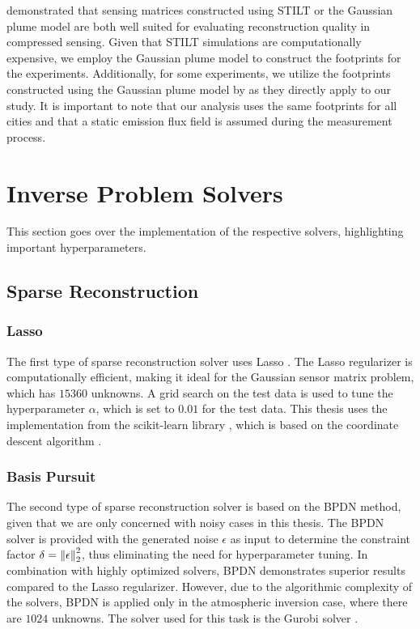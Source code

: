 \textcite{UrbanSparseReconstruction} demonstrated that sensing matrices constructed using STILT \parencite{STILT} or the Gaussian plume model are both well suited for evaluating reconstruction quality in compressed sensing.
Given that STILT simulations are computationally expensive, we employ the Gaussian plume model to construct the footprints for the experiments.
Additionally, for some experiments, we utilize the footprints constructed using the Gaussian plume model by \textcite{UrbanSparseReconstructionFootprints} as they directly apply to our study.
It is important to note that our analysis uses the same footprints for all cities and that a static emission flux field is assumed during the measurement process.

\section{Inverse Problem Solvers}
This section goes over the implementation of the respective solvers, highlighting important hyperparameters.

\subsection{Sparse Reconstruction}
\subsubsection{Lasso}
The first type of sparse reconstruction solver uses \gls{Lasso} \parencite{Lasso}.
The \gls{Lasso} regularizer is computationally efficient, making it ideal for the Gaussian sensor matrix problem, which has $15360$ unknowns.
A grid search \parencite{HyperParameters} on the test data is used to tune the hyperparameter $\alpha$, which is set to $0.01$ for the test data.
This thesis uses the implementation from the scikit-learn library \parencite{sklearn}, which is based on the coordinate descent algorithm \parencite{CoordinateDescent}.

\subsubsection{Basis Pursuit}
The second type of sparse reconstruction solver is based on the \gls{BPDN} \parencite{BPDN} method, given that we are only concerned with noisy cases in this thesis.
The \gls{BPDN} solver is provided with the generated noise $\epsilon$ as input to determine the constraint factor $\delta = \left\lVert\epsilon\right\rVert_2^2$, thus eliminating the need for hyperparameter tuning.
In combination with highly optimized solvers, \gls{BPDN} demonstrates superior results compared to the \gls{Lasso} regularizer.
However, due to the algorithmic complexity of the solvers, \gls{BPDN} is applied only in the atmospheric inversion case, where there are $1024$ unknowns.
The solver used for this task is the Gurobi solver \parencite{Gurobi}.

